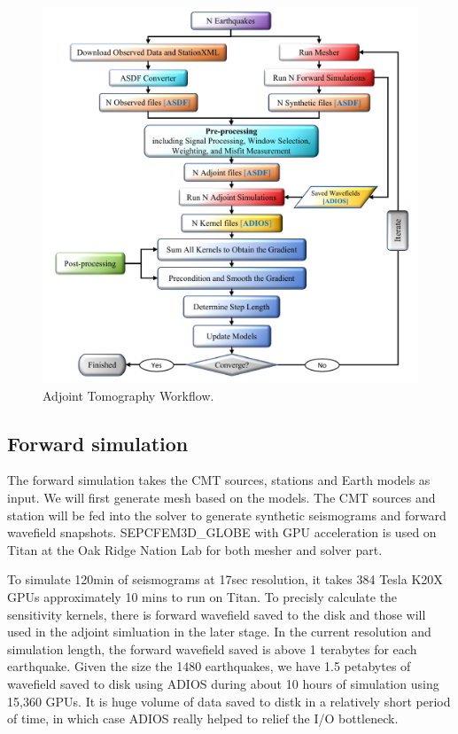 \documentclass[extra,mreferee]{gji}
\begin{document}
\begin{figure}
  \centering
  \includegraphics[width=\textwidth]{figures/adjoint_workflow_6.pdf}
  \caption{Adjoint Tomography Workflow.}
  \label{fig:adjoint_workflow}
\end{figure}

\subsection{Forward simulation}
The forward simulation takes the CMT sources, stations and Earth models as input.
We will first generate mesh based on the models. The CMT sources and station will
be fed into the solver to generate synthetic seismograms and forward wavefield snapshots.
SEPCFEM3D\_GLOBE with GPU acceleration is used on Titan at the Oak Ridge Nation Lab for
both mesher and solver part.

To simulate 120min of seismograms at 17sec resolution, it takes 384 Tesla K20X
GPUs approximately 10 mins to run on Titan. To precisly calculate the sensitivity
kernels, there is forward wavefield saved to the disk and those will used in the
adjoint simluation in the later stage. In the current resolution
and simulation length, the forward wavefield saved is above 1 terabytes
for each earthquake. Given the size the 1480 earthquakes, we have 1.5 petabytes of
wavefield saved to disk using ADIOS\citep{liu2014hello} during about 10 hours
of simulation using 15,360 GPUs.
It is huge volume of data saved to distk in a relatively short period of time, in which case
ADIOS really helped to relief the I/O bottleneck.
\end{document}
